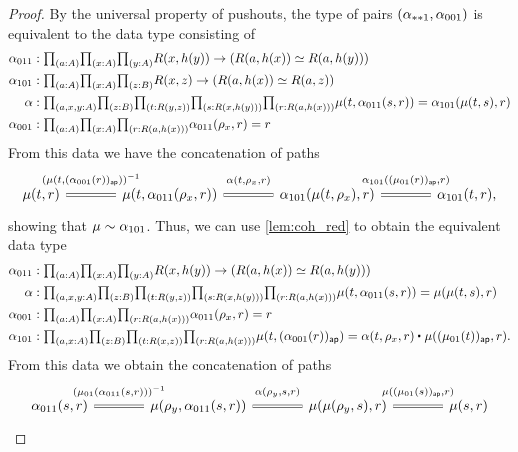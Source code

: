 \begin{proof}
By the universal property of pushouts, the type of pairs ${\mathopen{}(\alpha_{\ast\ast 1},\alpha_{001})\mathclose{}}$ is equivalent to the data type consisting of
\begin{align*}
\alpha_{011} & : \prd{a:A}{x:A}{y:A} R(x,h(y))\to (R(a,h(x)) \eqvsym R(a,h(y))) \\
\alpha_{101} & : \prd{a:A}{x:A}{z:B} R(x,z)\to (R(a,h(x)) \eqvsym R(a,z)) \\
\alpha & : \prd{a,x,y:A}{z:B}{t:R(y,z)}{s:R(x,h(y))}{r:R(a,h(x))} \mu(t,\alpha_{011}(s,r)) = \alpha_{101}(\mu(t,s),r) \\
\alpha_{001} & : \prd{a:A}{x:A}{r:R(a,h(x))} \alpha_{011}(\rho_x,r)=r
\end{align*}
From this data we have the concatenation of paths
\begin{equation*}
\begin{tikzcd}[column sep=large]
\mu(t,r) \arrow[r,equals,"{(\mu(t,(\alpha_{001}(r))_{\mathsf{ap}}))^{-1}}" yshift=1ex]
& \mu(t,\alpha_{011}(\rho_x,r)) \arrow[r,equals,"{\alpha(t,\rho_x,r)}" yshift=1ex]
& \alpha_{101}(\mu(t,\rho_x),r) \arrow[r,equals,"{\alpha_{101}((\mu_{01}(r))_{\mathsf{ap}},r)}" yshift=1ex]
& \alpha_{101}(t,r),
\end{tikzcd}
\end{equation*}
showing that $\mu\sim \alpha_{101}$. Thus, we can use \autoref{lem:coh_red} to obtain the equivalent data type
\begin{align*}
\alpha_{011} & : \prd{a:A}{x:A}{y:A} R(x,h(y))\to (R(a,h(x)) \eqvsym R(a,h(y))) \\
\alpha & : \prd{a,x,y:A}{z:B}{t:R(y,z)}{s:R(x,h(y))}{r:R(a,h(x))} \mu(t,\alpha_{011}(s,r)) = \mu(\mu(t,s),r) \\
\alpha_{001} & : \prd{a:A}{x:A}{r:R(a,h(x))} \alpha_{011}(\rho_x,r)=r \\
\alpha_{101} & : \prd{a,x:A}{z:B}{t:R(x,z)}{r:R(a,h(x))} \mu(t,(\alpha_{001}(r))_{\mathsf{ap}})=\ct{\alpha(t,\rho_x,r)}{\mu((\mu_{01}(t))_{\mathsf{ap}},r)}.
\end{align*}
From this data we obtain the concatenation of paths
\begin{equation*}
\begin{tikzcd}[column sep=large]
\alpha_{011}(s,r) \arrow[r,equals,"{(\mu_{01}(\alpha_{011}(s,r)))^{-1}}" yshift=1ex] & 
\mu(\rho_y,\alpha_{011}(s,r)) \arrow[r,equals,"{\alpha(\rho_y,s,r)}" yshift=1ex] & 
\mu(\mu(\rho_y,s),r) \arrow[r,equals,"{\mu((\mu_{01}(s))_{\mathsf{ap}},r)}" yshift=1ex] & 
\mu(s,r)
\end{tikzcd}
\end{equation*}

\end{proof}
